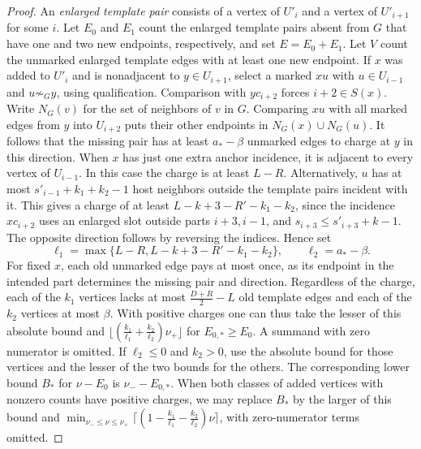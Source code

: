 \begin{proof}
An \emph{enlarged template pair} consists of a vertex of $U'_i$
and a vertex of $U'_{i+1}$ for some $i$. Let $E_0$ and $E_1$
count the enlarged template pairs absent
from $G$ that have one and two new endpoints, respectively, and set
$E=E_0+E_1$. Let $V$ count the unmarked enlarged template edges with
at least one new endpoint. If $x$ was added to $U'_i$ and is nonadjacent to
$y\in U_{i+1}$, select a marked $xu$ with $u\in U_{i-1}$ and
$u\not\sim_G y$, using qualification. Comparison with $yc_{i+2}$
forces $i+2\in S(x)$. Write $N_G(v)$ for the set of neighbors of
$v$ in $G$. Comparing $xu$ with all marked edges from $y$ into
$U_{i+2}$ puts their other endpoints in $N_G(x)\cup N_G(u)$.
It follows that the missing pair has at least $a_*-\beta$ unmarked edges
to charge at $y$ in this direction. When $x$ has just one extra anchor
incidence, it is adjacent to every vertex of $U_{i-1}$. In this case the charge
is at least $L-R$. Alternatively, $u$ has at most
$s'_{i-1}+k_1+k_2-1$ host neighbors outside the template pairs
incident with it. This gives a charge of at least
$L-k+3-R'-k_1-k_2$, since the incidence $xc_{i+2}$ uses an enlarged
slot outside parts $i+3,i-1$, and $s_{i+3}\leq s'_{i+3}+k-1$.
The opposite direction follows by reversing the indices. Hence set
\[
 \ell_1=\max\{L-R,L-k+3-R'-k_1-k_2\},\qquad \ell_2=a_*-\beta.
\]
For fixed $x$, each old unmarked edge pays at most once, as its endpoint
in the intended part determines the missing pair and direction.
Regardless of the charge, each of the $k_1$ vertices lacks at most
$\frac{D+R}{2}-L$ old template edges and each of the $k_2$ vertices at
most $\beta$. With positive charges one can thus take the lesser of this
absolute bound and $\lfloor(\frac{k_1}{\ell_1}+\frac{k_2}{\ell_2})\nu_+\rfloor$ for
$E_{0,*}\geq E_0$. A summand with zero numerator is omitted. If
$\ell_2\leq0$ and $k_2>0$, use the absolute bound for those vertices and
the lesser of the two bounds for the others. The corresponding lower
bound $B_*$ for $\nu-E_0$ is $\nu_--E_{0,*}$. When both classes of added
vertices with nonzero counts have positive charges, we may replace
$B_*$ by the larger of this bound and
$\min_{\nu_-\leq \nu\leq \nu_+}\bigl\lceil
(1-\frac{k_1}{\ell_1}-\frac{k_2}{\ell_2})\nu\bigr\rceil$,
with zero-numerator terms omitted.


\end{proof}
